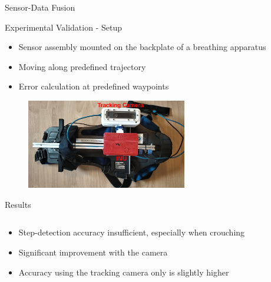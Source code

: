 \documentclass[aspectratio=169]{beamer}
\begin{document}
{\begin{frame}{Sensor-Data Fusion}
	\end{frame}
	
	
	\begin{frame}{Experimental Validation - Setup}
		\begin{itemize}
			\item<2-> Sensor assembly mounted on the backplate of a breathing apparatus
			\item<3-> Moving along predefined trajectory
			\item<4-> Error calculation at predefined waypoints
		\end{itemize}
		\begin{figure}
			\centering
			\includegraphics[width=7cm]{../Conference_Paper/Assembly.jpg}
		\end{figure}
		
	\end{frame}
	
	
		\begin{frame}{Results}
		\begin{columns}
			\begin{column}{0.45\textwidth}
				\begin{itemize}
					\item<2-> Step-detection accuracy insufficient, especially when crouching
					\item<3-> Significant improvement with the camera
					\item<4-> Accuracy using the tracking camera  only is slightly higher %
				\end{itemize}
				\vspace{2.4cm}
				

\end{column}
\end{columns}
\end{frame}}
\end{document}
